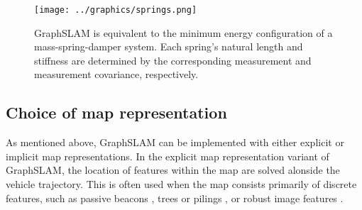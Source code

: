 \begin{figure}[htbp]
   \centering
   \texttt{[image: ../graphics/springs.png]} %
   \caption{GraphSLAM is equivalent to the minimum energy configuration of a mass-spring-damper system. Each spring's natural length and stiffness are determined by the corresponding measurement and measurement covariance, respectively.}
   \label{fig:springs}
\end{figure}


\subsection{Choice of map representation}

As mentioned above, GraphSLAM can be implemented with either explicit or implicit map representations. In the explicit map representation variant of GraphSLAM, the location of features within the map are solved alonside the vehicle trajectory. This is often used when the map consists primarily of discrete features, such as passive beacons \cite{?}, trees or pilings \cite{Langellaan}, or robust image features \cite{Augenstein}.

